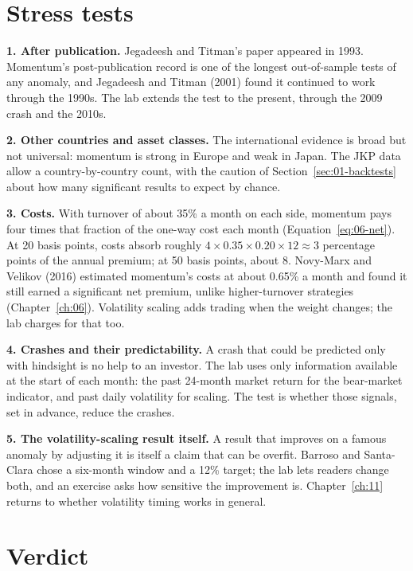 \section{Stress tests}
\label{sec:09-stress}

\textbf{1. After publication.} Jegadeesh and Titman's paper appeared in 1993. Momentum's post-publication record is one of the longest out-of-sample tests of any anomaly, and Jegadeesh and Titman (2001) found it continued to work through the 1990s. The lab extends the test to the present, through the 2009 crash and the 2010s.

\textbf{2. Other countries and asset classes.} The international evidence is broad but not universal: momentum is strong in Europe and weak in Japan. The JKP data allow a country-by-country count, with the caution of Section~\ref{sec:01-backtests} about how many significant results to expect by chance.

\textbf{3. Costs.} With turnover of about 35\% a month on each side, momentum pays four times that fraction of the one-way cost each month (Equation~\eqref{eq:06-net}). At 20 basis points, costs absorb roughly $4 \times 0.35 \times 0.20 \times 12 \approx 3$ percentage points of the annual premium; at 50 basis points, about 8. Novy-Marx and Velikov (2016) estimated momentum's costs at about 0.65\% a month and found it still earned a significant net premium, unlike higher-turnover strategies (Chapter~\ref{ch:06}). Volatility scaling adds trading when the weight changes; the lab charges for that too.

\textbf{4. Crashes and their predictability.} A crash that could be predicted only with hindsight is no help to an investor. The lab uses only information available at the start of each month: the past 24-month market return for the bear-market indicator, and past daily volatility for scaling. The test is whether those signals, set in advance, reduce the crashes.

\textbf{5. The volatility-scaling result itself.} A result that improves on a famous anomaly by adjusting it is itself a claim that can be overfit. Barroso and Santa-Clara chose a six-month window and a 12\% target; the lab lets readers change both, and an exercise asks how sensitive the improvement is. Chapter~\ref{ch:11} returns to whether volatility timing works in general.

\section{Verdict}
\label{sec:09-verdict}

